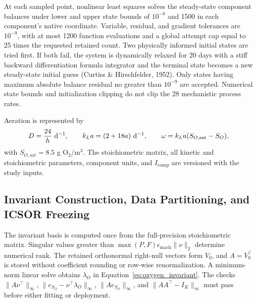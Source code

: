 \documentclass[a4paper,fleqn]{cas-sc}
\begin{document}
At each sampled point, nonlinear least squares solves the steady-state component balances under lower and upper state bounds of $10^{-8}$ and 1500 in each component's native coordinate. Variable, residual, and gradient tolerances are $10^{-9}$, with at most 1200 function evaluations and a global attempt cap equal to 25 times the requested retained count. Two physically informed initial states are tried first. If both fail, the system is dynamically relaxed for 20 days with a stiff backward differentiation formula integrator and the terminal state becomes a new steady-state initial guess (Curtiss \& Hirschfelder, 1952). Only states having maximum absolute balance residual no greater than $10^{-9}$ are accepted. Numerical state bounds and initialization clipping do not clip the 28 mechanistic process rates.

Aeration is represented by
\begin{equation}
\label{eq:aeration_model}
D=\frac{24}{h}\ {\rm d}^{-1},\qquad
k_La=(2+18a)\ {\rm d}^{-1},\qquad
\omega=k_La(S_{O,\mathrm{sat}}-S_O),
\end{equation}
with $S_{O,\mathrm{sat}}=8.5$ g O$_2$/m$^3$. The stoichiometric matrix, all kinetic and stoichiometric parameters, component units, and $I_{\mathrm{comp}}$ are versioned with the study inputs.

\subsection{Invariant Construction, Data Partitioning, and ICSOR Freezing}

The invariant basis is computed once from the full-precision stoichiometric matrix. Singular values greater than $\max(P,F)\epsilon_{\mathrm{mach}}\|\nu\|_2$ determine numerical rank. The retained orthonormal right-null vectors form $V_0$, and $A=V_0^\top$ is stored without coefficient rounding or row-wise renormalization. A minimum-norm linear solve obtains $\lambda_O$ in Equation~\eqref{eq:oxygen_invariant}. The checks $\|A\nu^\top\|_\infty$, $\|e_{S_O}-\nu^\top\lambda_O\|_\infty$, $\|Ae_{S_O}\|_\infty$, and $\|AA^\top-I_K\|_\infty$ must pass before either fitting or deployment.
\end{document}
